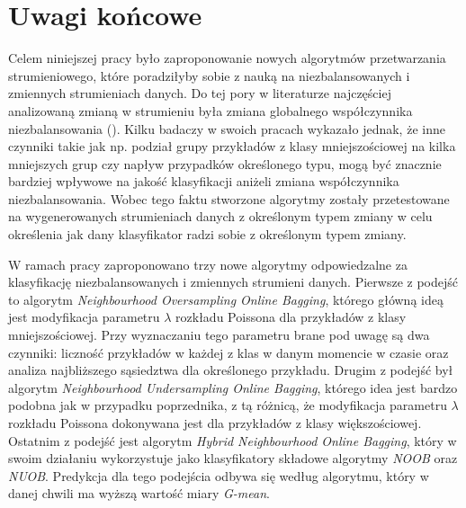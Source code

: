 \chapter{Uwagi końcowe}

\noindent Celem niniejszej pracy było zaproponowanie nowych algorytmów przetwarzania strumieniowego, które poradziłyby sobie z nauką na niezbalansowanych i zmiennych strumieniach danych. Do tej pory w literaturze najczęściej analizowaną zmianą w strumieniu była zmiana globalnego współczynnika niezbalansowania (). Kilku badaczy w swoich pracach wykazało jednak, że inne czynniki takie jak np. podział grupy przykładów z klasy mniejszościowej na kilka mniejszych grup czy napływ przypadków określonego typu, mogą być znacznie bardziej wpływowe na jakość klasyfikacji aniżeli zmiana współczynnika niezbalansowania. Wobec tego faktu stworzone algorytmy zostały przetestowane na wygenerowanych strumieniach danych z określonym typem zmiany w celu określenia jak dany klasyfikator radzi sobie z określonym typem zmiany.

W ramach pracy zaproponowano trzy nowe algorytmy odpowiedzalne za klasyfikację niezbalansowanych i zmiennych strumieni danych. Pierwsze z podejść to algorytm \textit{Neighbourhood Oversampling Online Bagging}, którego główną ideą jest modyfikacja parametru $\lambda$ rozkładu Poissona dla przykładów z klasy mniejszościowej. Przy wyznaczaniu tego parametru brane pod uwagę są dwa czynniki: liczność przykładów w każdej z klas w danym momencie w czasie oraz analiza najbliższego sąsiedztwa dla określonego przykładu. Drugim z podejść był algorytm \textit{Neighbourhood Undersampling Online Bagging}, którego idea jest bardzo podobna jak w przypadku poprzednika, z tą różnicą, że modyfikacja parametru $\lambda$ rozkładu Poissona dokonywana jest dla przykładów z klasy większościowej. Ostatnim z podejść jest algorytm \textit{Hybrid Neighbourhood Online Bagging}, który w swoim działaniu wykorzystuje jako klasyfikatory składowe algorytmy \textit{NOOB} oraz \textit{NUOB}. Predykcja dla tego podejścia odbywa się według algorytmu, który w danej chwili ma wyższą wartość miary \textit{G-mean}.


